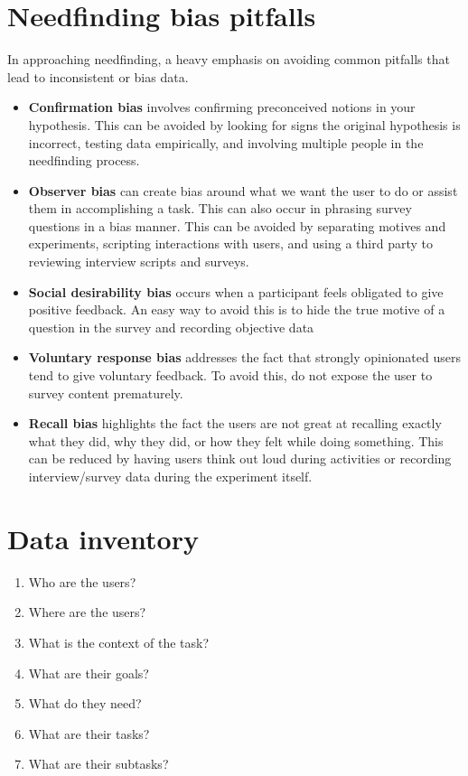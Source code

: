 \section{Needfinding bias pitfalls}

In approaching needfinding, a heavy emphasis on avoiding common pitfalls that lead to inconsistent or bias data.

\begin{itemize}
\item
  \textbf{Confirmation bias} involves confirming preconceived notions in your hypothesis. This can be avoided by looking for signs the original hypothesis is incorrect, testing data empirically, and involving multiple people in the needfinding process.
\item
  \textbf{Observer bias} can create bias around what we want the user to do or assist them in accomplishing a task. This can also occur in phrasing survey questions in a bias manner. This can be avoided by separating motives and experiments, scripting interactions with users, and using a third party to reviewing interview scripts and surveys.
\item
  \textbf{Social desirability bias} occurs when a participant feels obligated to give positive feedback. An easy way to avoid this is to hide the true motive of a question in the survey and recording objective data
\item
  \textbf{Voluntary response bias} addresses the fact that strongly opinionated users tend to give voluntary feedback. To avoid this, do not expose the user to survey content prematurely.
\item
  \textbf{Recall bias} highlights the fact the users are not great at recalling exactly what they did, why they did, or how they felt while doing something. This can be reduced by having users think out loud during activities or recording interview/survey data during the experiment itself.
\end{itemize}

\section{Data inventory}

\begin{enumerate}
\item
  Who are the users?
\item
  Where are the users?
\item
  What is the context of the task?
\item
  What are their goals?
\item
  What do they need?
\item
  What are their tasks?
\item
  What are their subtasks?
\end{enumerate}

